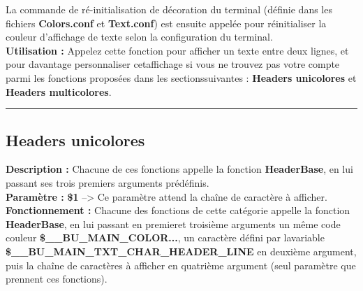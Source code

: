 \documentclass[a4paper,10pt]{article}
\begin{document}
La commande de ré-initialisation de décoration du terminal (définie dans les fichiers \textbf{\color{lime}Colors.conf\color{white}} et \textbf{\color{lime}Text.conf\color{white}}) est ensuite appelée pour réinitialiser la couleur d'affichage de texte selon la configuration du terminal.\\[1\baselineskip]

\textbf{Utilisation :}\linebreak
Appelez cette fonction pour afficher un texte entre deux lignes, et pour davantage personnaliser cet\linebreak affichage si vous ne trouvez pas votre compte parmi les fonctions proposées dans les sections\linebreak suivantes :
\textbf{\color{green}Headers unicolores\color{white}} et \textbf{\color{green}Headers multicolores\color{white}}.\\[1\baselineskip]


\color{green}\par\noindent\rule{\textwidth}{0.4pt}\color{white}

\color{green}
\subsection{Headers unicolores}\color{white}
\textbf{Description :}\linebreak
Chacune de ces fonctions appelle la fonction \textbf{\color{mauve}HeaderBase\color{white}}, en lui passant ses trois premiers\linebreak
arguments prédéfinis.\\[1\baselineskip]

\textbf{Paramètre :}\linebreak
\textbf{\color{orange}\$1\color{white}} --> Ce paramètre attend la chaîne de caractère à afficher.\\[1\baselineskip]


\textbf{Fonctionnement :}\linebreak
Chacune des fonctions de cette catégorie appelle la fonction \textbf{\color{mauve}HeaderBase\color{white}}, en lui passant en premier\linebreak et troisième arguments un même code couleur \textbf{\color{orange}\$\_\_BU\_MAIN\_COLOR...\color{white}}, un caractère défini par la\linebreak variable \textbf{\color{orange}\$\_\_BU\_MAIN\_TXT\_CHAR\_HEADER\_LINE\color{white}} en deuxième argument, puis la chaîne de caractères à afficher en quatrième argument (seul paramètre que prennent ces fonctions).\\[1\baselineskip]
\end{document}
